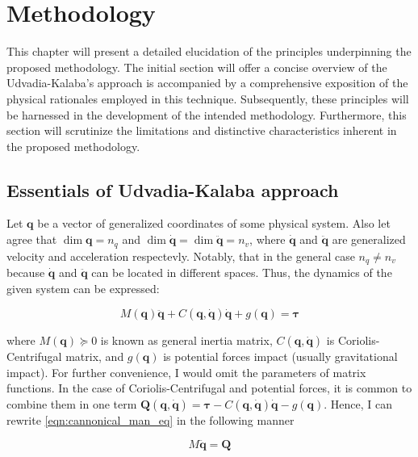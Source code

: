 \chapter{Methodology}
\label{chap:met}

This chapter will present a detailed elucidation of the principles underpinning the 
proposed methodology. The initial section will offer a concise overview of the 
Udvadia-Kalaba's approach is accompanied by a comprehensive exposition of the physical 
rationales employed in this technique. Subsequently, these principles will be 
harnessed in the development of the intended methodology. Furthermore, this section 
will scrutinize the limitations and distinctive characteristics inherent in the 
proposed methodology.

\section{Essentials of Udvadia-Kalaba approach}

Let $\mathbf{q}$ be a vector of generalized coordinates of some physical system.
Also let agree that $\dim \mathbf{q} = n_q$ and 
$\dim \dot{\mathbf{q}} = \dim \ddot{\mathbf{q}} = n_v$, where $\dot{\mathbf{q}}$ and 
$\ddot{\mathbf{q}}$ are generalized velocity and acceleration respectevly. Notably, 
that in the general case $n_q \neq n_v$ because $\dot{\mathbf{q}}$ and $\ddot{\mathbf{q}}$ 
can be located in different spaces. Thus, the dynamics of the given system can be 
expressed:

\begin{equation}
    \label{eqn:cannonical_man_eq}
    M(\mathbf{q}) \ddot{\mathbf{q}} 
    + C(\mathbf{q}, \dot{\mathbf{q}}) \dot{\mathbf{q}} 
    + g(\mathbf{q}) = \boldsymbol{\tau}
\end{equation}

where $M(\mathbf{q}) \succeq 0 $ is known as general inertia matrix, 
$C(\mathbf{q}, \dot{\mathbf{q}})$ is Coriolis-Centrifugal matrix, and 
$g(\mathbf{q})$ is potential forces impact (usually gravitational impact). 
For further convenience, I would omit the parameters of matrix functions. 
In the case of Coriolis-Centrifugal and potential forces, it is common to 
combine them in one term $\mathbf{Q}(\mathbf{q}, \dot{\mathbf{q}}) = \boldsymbol{\tau}
- C(\mathbf{q}, \dot{\mathbf{q}}) \dot{\mathbf{q}} - g(\mathbf{q})$. Hence, I can 
rewrite \ref{eqn:cannonical_man_eq} in the following manner

\begin{equation}
    \label{eqn:compact_man_eq}
    M \ddot{\mathbf{q}} = \mathbf{Q}
\end{equation}

